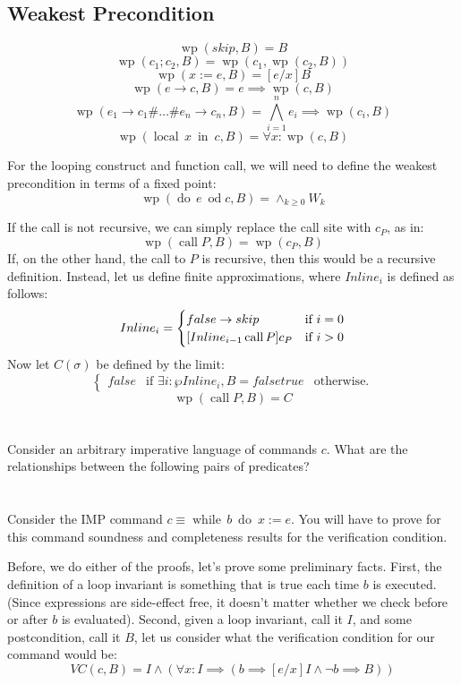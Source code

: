 \documentclass{article}
\newcommand{\problem}[1]
{\subsubsection*{} %
\vspace{-16pt} \section{} \vspace{-22pt} \qquad
#1%
\bigskip \bigskip
}
\newcommand{\while}[2]{\operatorname{while}\, #1\ \operatorname{do}\ #2}
\newcommand{\dood}[1]{\operatorname{do}\, #1\ \operatorname{od}}
\newcommand{\callP}{\operatorname{call} P}
\newcommand{\localin}[2]{\operatorname{local}\, #1\ \operatorname{in}\ #2}
\begin{document}
\subsection{Weakest Precondition}
\newcommand{\weakest}[2]{\operatorname{wp}(#1, #2)}
\[
\weakest{skip}{B} = B
\]
\[
\weakest{c_1;c_2}{B} = \weakest{c_1}{\weakest{c_2}{B}}
\]
\[
\weakest{x := e}{B} = [e/x]B
\]
\[
\weakest{e \to c}{B} = e \implies \weakest{c}{B}
\]
\[
\weakest{e_1 \rightarrow c_1 \# \dots \# e_n \rightarrow c_n}{B}
= \bigwedge_{i=1}^n e_i \implies \weakest{c_i}{B}
\]
\[
\weakest{\localin{x}{c}}{B}
= \forall x: \weakest{c}{B}
\]

For the looping construct and function call, we will need to define the weakest precondition in terms of a fixed point:
\[
\weakest{\dood{e}{c}}{B} = \wedge_{k \ge 0} W_k
\]

If the call is not recursive, we can simply replace the call site with $c_P$, as in:
\[
\weakest{\callP}{B} = \weakest{c_P}{B}
\]
If, on the other hand, the call to $P$ is recursive, then this would be a recursive definition.  Instead, let us define finite approximations, where $Inline_i$ is defined as follows:
\[
Inline_i = \begin{cases}
  false \to skip &\text{if } i=0 \\
  [Inline_{i-1}\/\callP]c_P &\text{if } i > 0
\end{cases}
\]
Now let $C(\sigma)$ be defined by the limit:
\[
\begin{cases}
  false &\text{if } \exists i : \wp{Inline_i, B} = false
  true &\text{otherwise}.
\end{cases}
\]
\[
\weakest{\callP}{B} = C
\]

\problem{Consider an arbitrary imperative language of commands $c$. What are
the relationships between the following pairs of predicates?}

\problem{Consider the IMP command $c \equiv \while{b}{x := e}$.
You will have to prove for this command soundness and completeness results for
the verification condition.
}

Before, we do either of the proofs, let's prove some preliminary facts.
First, the definition of a loop invariant is something that is true
each time $b$ is executed. (Since expressions are side-effect free, it doesn't
matter whether we check before or after $b$ is evaluated).
Second, given a loop invariant, call it $I$, and some postcondition, call it $B$,
let us consider what the verification condition for our command would be:
\[
VC(c, B) = I \wedge \left( \forall x : I \implies (b \implies [e/x]I \wedge \neg b \implies B) \right)
\]
\end{document}
